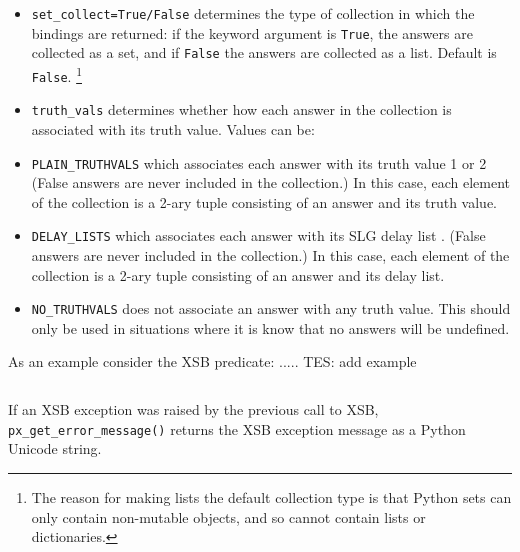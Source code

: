 \begin{description}
\begin{itemize}
    \noindent
    The default is {\tt 1}.
    
    \item {\tt set\_collect=True/False} determines the type of
      collection in which the bindings are returned: if the keyword
      argument is {\tt True}, the answers are collected as a set, and
      if {\tt False} the answers are collected as a list.  Default is
      {\tt False}. \footnote{The reason for making lists the default
        collection type is that Python sets can only contain
        non-mutable objects, and so cannot contain lists or
        dictionaries.}
      
    \item {\tt truth\_vals} determines whether how each answer in the
      collection is associated with its truth value.  Values can be:
      
      \bi

      \item {\tt PLAIN\_TRUTHVALS} which associates each answer with its
      truth value 1 or 2 (False answers are never included in the
      collection.)  In this case, each element of the collection is a
      2-ary tuple consisting of an answer and its truth value.
      
      \item {\tt DELAY\_LISTS} which associates each answer with its
        SLG delay list \cite{}. (False answers are never included in
        the collection.)  In this case, each element of the collection
        is a 2-ary tuple consisting of an answer and its delay list.

      \item {\tt NO\_TRUTHVALS} does not associate an answer with any
        truth value.  This should only be used in situations where it
        is know that no answers will be undefined.

        \ei

  \end{itemize}

  As an example consider the XSB predicate: ..... {\sc TES: add example}
\begin{verbatim}
\end{verbatim}
  
%
  If an XSB exception was raised by the previous call to XSB, {\tt
    px\_get\_error\_message()} returns the XSB exception message as a
  Python Unicode string.
  
  

\end{description}

